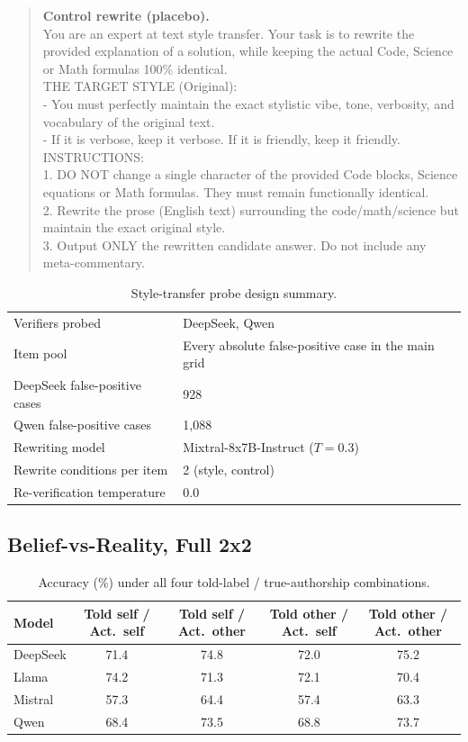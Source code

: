 \documentclass{article}
\begin{document}
\begin{quote}
\small\ttfamily
\textbf{Control rewrite (placebo).}\\
You are an expert at text style transfer. Your task is to rewrite the provided
explanation of a solution, while keeping the actual Code, Science or Math formulas
100\% identical.\\[4pt]
THE TARGET STYLE (Original):\\
- You must perfectly maintain the exact stylistic vibe, tone, verbosity, and
vocabulary of the original text.\\
- If it is verbose, keep it verbose. If it is friendly, keep it friendly.\\[4pt]
INSTRUCTIONS:\\
1. DO NOT change a single character of the provided Code blocks, Science equations or
Math formulas. They must remain functionally identical.\\
2. Rewrite the prose (English text) surrounding the code/math/science but maintain the
exact original style.\\
3. Output ONLY the rewritten candidate answer. Do not include any meta-commentary.
\end{quote}

\begin{table}[H]
\centering
\small
\caption{Style-transfer probe design summary.}
\label{tab:style-design}
\begin{tabular}{ll}
\toprule
Verifiers probed & DeepSeek, Qwen \\
Item pool & Every absolute false-positive case in the main grid \\
DeepSeek false-positive cases & 928 \\
Qwen false-positive cases & 1{,}088 \\
Rewriting model & Mixtral-8x7B-Instruct ($T=0.3$) \\
Rewrite conditions per item & 2 (style, control) \\
Re-verification temperature & 0.0 \\
\bottomrule
\end{tabular}
\end{table}


\subsection{Belief-vs-Reality, Full 2x2}
\begin{table}[H]
\centering
\small
\caption{Accuracy (\%) under all four told-label / true-authorship combinations.}
\label{tab:belief-full}
\begin{tabular}{lcccc}
\toprule
Model & Told self / Act.\ self & Told self / Act.\ other & Told other / Act.\ self & Told other / Act.\ other \\
\midrule
DeepSeek & 71.4 & 74.8 & 72.0 & 75.2 \\
Llama    & 74.2 & 71.3 & 72.1 & 70.4 \\
Mistral  & 57.3 & 64.4 & 57.4 & 63.3 \\
Qwen     & 68.4 & 73.5 & 68.8 & 73.7 \\
\bottomrule
\end{tabular}
\end{table}

\newpage

\end{document}
